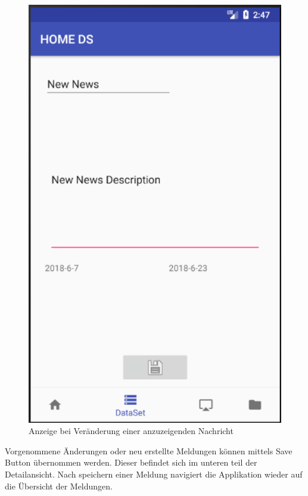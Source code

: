 \\
\begin{figure}[H]
\centering
\includegraphics[width=1.0\textwidth]{images/06_AndroidApp/06_EditNews}
\caption{Anzeige bei Veränderung einer anzuzeigenden Nachricht}
\label{fig:mediaNav}
\end{figure}
Vorgenommene Änderungen oder neu erstellte Meldungen können mittels Save Button übernommen werden. Dieser befindet sich im unteren teil der Detailansicht. Nach speichern einer Meldung navigiert die Applikation wieder auf die Übersicht der Meldungen.

